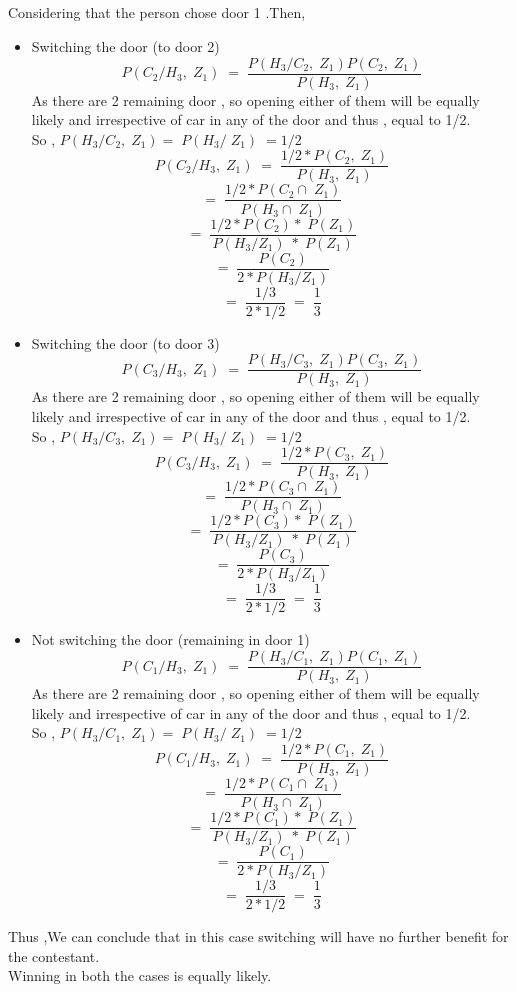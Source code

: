 \documentclass[11pt,a4paper,titlepage]{article}
\begin{document}
{{\subsection{}{
Considering that the person chose door 1 .Then,
\begin{itemize}
    \item Switching the door (to door 2)
    $$P(C_2/H_3,\; Z_1)\;=\; \frac{P(H_3/C_2, \;Z_1)P(C_2,\; Z_1)}{P(H_3,\; Z_1)}$$
    As there are 2 remaining door , so opening either of them will be equally likely and irrespective of car in any of the door and thus , equal to 1/2. \\
    So , $P(H_3/C_2, \;Z_1) =\; P(H_3/\;Z_1)\; = 1/2$
    $$P(C_2/H_3,\; Z_1)\;=\; \frac{1/2*P(C_2,\; Z_1)}{P(H_3,\; Z_1)}$$
    $$=\; \frac{1/2*P(C_2\cap\; Z_1)}{P(H_3\cap\; Z_1)}$$
    $$=\; \frac{1/2*P(C_2)*\;P( Z_1)}{P(H_3/Z_1)\;*\; P(Z_1)}$$
    $$=\;\frac{P(C_2)}{2*P(H_3/Z_1)}$$
    $$=\;\frac{1/3}{2*1/2} \;= \;\frac{1}{3}$$
    
    \item Switching the door (to door 3)
    $$P(C_3/H_3,\; Z_1)\;=\; \frac{P(H_3/C_3, \;Z_1)P(C_3,\; Z_1)}{P(H_3,\; Z_1)}$$
    As there are 2 remaining door , so opening either of them will be equally likely and irrespective of car in any of the door and thus , equal to 1/2. \\
    So , $P(H_3/C_3, \;Z_1) =\; P(H_3/\;Z_1)\; = 1/2$
    $$P(C_3/H_3,\; Z_1)\;=\; \frac{1/2*P(C_3,\; Z_1)}{P(H_3,\; Z_1)}$$
    $$=\; \frac{1/2*P(C_3\cap\; Z_1)}{P(H_3\cap\; Z_1)}$$
    $$=\; \frac{1/2*P(C_3)*\;P( Z_1)}{P(H_3/Z_1)\;*\; P(Z_1)}$$
    $$=\;\frac{P(C_3)}{2*P(H_3/Z_1)}$$
    $$=\;\frac{1/3}{2*1/2} \;= \;\frac{1}{3}$$

    \item Not switching the door (remaining in door 1)
    $$P(C_1/H_3,\; Z_1)\;=\; \frac{P(H_3/C_1, \;Z_1)P(C_1,\; Z_1)}{P(H_3,\; Z_1)}$$
    As there are 2 remaining door , so opening either of them will be equally likely and irrespective of car in any of the door and thus , equal to 1/2. \\
    So , $P(H_3/C_1, \;Z_1) =\; P(H_3/\;Z_1)\; = 1/2$
    $$P(C_1/H_3,\; Z_1)\;=\; \frac{1/2*P(C_1,\; Z_1)}{P(H_3,\; Z_1)}$$
    $$=\; \frac{1/2*P(C_1\cap\; Z_1)}{P(H_3\cap\; Z_1)}$$
    $$=\; \frac{1/2*P(C_1)*\;P( Z_1)}{P(H_3/Z_1)\;*\; P(Z_1)}$$
    $$=\;\frac{P(C_1)}{2*P(H_3/Z_1)}$$
    $$=\;\frac{1/3}{2*1/2} \;= \;\frac{1}{3}$$   
\end{itemize}
Thus ,We can conclude that in this case switching will have no further benefit for the contestant.
\\
Winning in both the cases is equally likely.
}






}}
\end{document}
